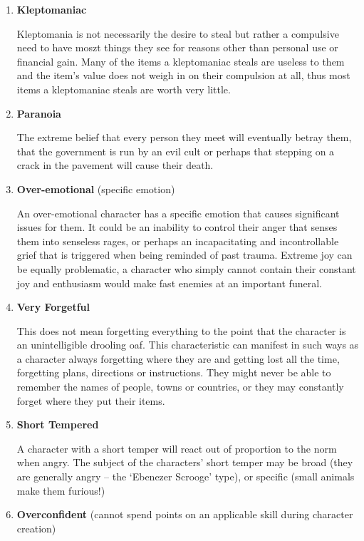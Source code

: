 \begin{enumerate}
    \item \textbf{Kleptomaniac}
    
    Kleptomania is not necessarily the desire to steal but rather a compulsive need to have moszt things they see for reasons other than personal use or financial gain. Many of the items a kleptomaniac steals are useless to them and the item’s value does not weigh in on their compulsion at all, thus most items a kleptomaniac steals are worth very little.

    \item \textbf{Paranoia}
    
    The extreme belief that every person they meet will eventually betray them, that the government is run by an evil cult or perhaps that stepping on a crack in the pavement will cause their death.

    \item \textbf{Over-emotional} (specific emotion)
    
    An over-emotional character has a specific emotion that causes significant issues for them. It could be an inability to control their anger that senses them into senseless rages, or perhaps an incapacitating and incontrollable grief that is triggered when being reminded of past trauma. Extreme joy can be equally problematic, a character who simply cannot contain their constant joy and enthusiasm would make fast enemies at an important funeral.

    \item \textbf{Very Forgetful}
    
    This does not mean forgetting everything to the point that the character is an unintelligible drooling oaf. This characteristic can manifest in such ways as a character always forgetting where they are and getting lost all the time, forgetting plans, directions or instructions. They might never be able to remember the names of people, towns or countries, or they may constantly forget where they put their items.

    \item \textbf{Short Tempered}
    
    A character with a short temper will react out of proportion to the norm when angry. The subject of the characters’ short temper may be broad (they are generally angry – the ‘Ebenezer Scrooge’ type), or specific (small animals make them furious!)

    \item \textbf{Overconfident} (cannot spend points on an applicable skill during character creation)
    

\end{enumerate}
